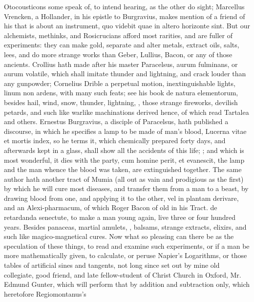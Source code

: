 {Otocousticons some speak of, to intend hearing, as the other do sight;
Marcellus Vrencken, a Hollander, in his epistle to Burgravius, makes
mention of a friend of his that is about an instrument, quo videbit
quae in altero horizonte sint. But our alchemists, methinks, and
Rosicrucians afford most rarities, and are fuller of experiments: they
can make gold, separate and alter metals, extract oils, salts, lees,
and do more strange works than Geber, Lullius, Bacon, or any of those
ancients. Crollius hath made after his master Paracelsus, aurum
fulminans, or aurum volatile, which shall imitate thunder and
lightning, and crack louder than any gunpowder; Cornelius Drible a
perpetual motion, inextinguishable lights, linum non ardens, with many
such feats; see his book de natura elementorum, besides hail, wind,
snow, thunder, lightning, \etc{}, those strange fireworks, devilish
petards, and such like warlike machinations derived hence, of which
read Tartalea and others. Ernestus Burgravius, a disciple of
Paracelsus, hath published a discourse, in which he specifies a lamp to
be made of man's blood, Lucerna vitae et mortis index, so he terms it,
which chemically prepared forty days, and afterwards kept in a glass,
shall show all the accidents of this life; ;
and which is most wonderful, it dies with the party, cum homine
perit, et evanescit, the lamp and the man whence the blood was taken,
are extinguished together. The same author hath another tract of Mumia
(all out as vain and prodigious as the first) by which he will cure
most diseases, and transfer them from a man to a beast, by drawing
blood from one, and applying it to the other, vel in plantam derivare,
and an Alexi-pharmacum, of which Roger Bacon of old in his Tract. de
retardanda senectute, to make a man young again, live three or four
hundred years. Besides panaceas, martial amulets, ,
balsams, strange extracts, elixirs, and such like magico-magnetical
cures. Now what so pleasing can there be as the speculation of these
things, to read and examine such experiments, or if a man be more
mathematically given, to calculate, or peruse Napier's Logarithms, or
those tables of artificial sines and tangents, not long since set
out by mine old collegiate, good friend, and late fellow-student of
Christ Church in Oxford, Mr. Edmund Gunter, which will perform
that by addition and subtraction only, which heretofore Regiomontanus's
}
